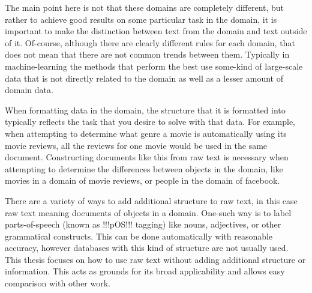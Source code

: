 The main point here is not that these domains are completely different, but rather to achieve good results on some particular task in the domain, it is important to make the distinction between text from the domain and text outside of it. Of-course, although there are clearly different rules for each domain, that does not mean that there are not common trends between them. Typically in machine-learning the methods that perform the best use some-kind of large-scale data that is not directly related to the domain as well as a lesser amount of domain data. 

When formatting data in the domain, the structure that it is formatted into typically reflects the task that you desire to solve with that data. For example, when attempting to determine what genre a movie is automatically using its movie reviews, all the reviews for one movie would be used in the same document. Constructing documents like this from raw text is necessary when attempting to determine the differences between objects in the domain, like movies in a domain of movie reviews, or people in the domain of facebook.

There are a variety of ways to add additional structure to raw text, in this case raw text meaning documents of objects in a domain. One-such way is to label parts-of-speech (known as !!!pOS!!! tagging) like nouns, adjectives, or other grammatical constructs. This can be done automatically with reasonable accuracy, however databases with this kind of structure are not usually used. This thesis focuses on how to use raw text without adding additional structure or information. This acts as grounds for its broad applicability and allows easy comparison with other work.


